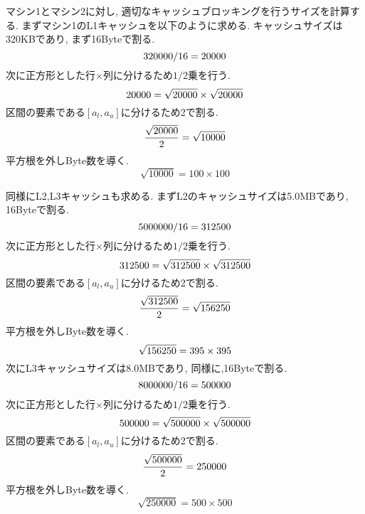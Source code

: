 \documentclass[11pt,a4paper]{jsreport}
\theoremstyle{definition}
\begin{document}
マシン1とマシン2に対し, 適切なキャッシュブロッキングを行うサイズを計算する. まずマシン1のL1キャッシュを以下のように求める. キャッシュサイズは320KBであり, まず16Byteで割る. 
\begin{equation}
320000 / 16 = 20000 \\
\end{equation}
次に正方形とした行$\times$列に分けるため$1/2$乗を行う.
\begin{equation}
20000 = \sqrt{20000} \times \sqrt{20000} \\
\end{equation}
区間の要素である$[a_l,a_u]$に分けるため2で割る.
\begin{equation}
\frac{\sqrt{20000}}{2} = \sqrt{10000} \\
\end{equation}
平方根を外しByte数を導く.
\begin{equation}
\sqrt{10000} = 100 \times 100
\end{equation}

同様にL2,L3キャッシュも求める. まずL2のキャッシュサイズは5.0MBであり, 16Byteで割る.
\begin{equation}
5000000 / 16 = 312500 \\
\end{equation}
次に正方形とした行$\times$列に分けるため$1/2$乗を行う.
\begin{equation}
312500 = \sqrt{312500} \times \sqrt{312500} \\
\end{equation}
区間の要素である$[a_l,a_u]$に分けるため2で割る.
\begin{equation}
\frac{\sqrt{312500}}{2} = \sqrt{156250} \\
\end{equation}
平方根を外しByte数を導く.
\begin{equation}
\sqrt{156250} = 395 \times 395 \\
\end{equation}
次にL3キャッシュサイズは8.0MBであり, 同様に,16Byteで割る.
\begin{equation}
8000000 /16 = 500000 \\
\end{equation}
次に正方形とした行$\times$列に分けるため$1/2$乗を行う.
\begin{equation}
500000 = \sqrt{500000} \times \sqrt{500000} \\
\end{equation}
区間の要素である$[a_l,a_u]$に分けるため2で割る.
\begin{equation}
\frac{\sqrt{500000}}{2} = {250000} \\
\end{equation}
平方根を外しByte数を導く.
\begin{equation}
\sqrt{250000} = 500 \times 500 
\end{equation}
\end{document}
